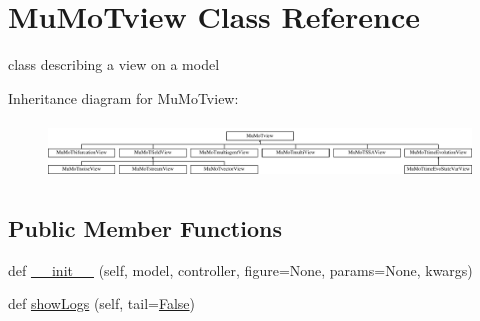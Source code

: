 \hypertarget{class_mu_mo_t_1_1_mu_mo_t_1_1_mu_mo_tview}{}\section{Mu\+Mo\+Tview Class Reference}
\label{class_mu_mo_t_1_1_mu_mo_t_1_1_mu_mo_tview}


class describing a view on a model  


Inheritance diagram for Mu\+Mo\+Tview\+:\begin{figure}[H]
\begin{center}
\leavevmode
\includegraphics[height=1.521739cm]{class_mu_mo_t_1_1_mu_mo_t_1_1_mu_mo_tview}
\end{center}
\end{figure}
\subsection*{Public Member Functions}
\begin{DoxyCompactItemize}
\item 
def \hyperlink{class_mu_mo_t_1_1_mu_mo_t_1_1_mu_mo_tview_a367325b3bd7ca4a7b7ec4107f9aa6a16}{\+\_\+\+\_\+init\+\_\+\+\_\+} (self, model, controller, figure=None, params=None, kwargs)
\item 
def \hyperlink{class_mu_mo_t_1_1_mu_mo_t_1_1_mu_mo_tview_a64ca78b9bf9f0f3150077ab79405a674}{show\+Logs} (self, tail=\hyperlink{namespace_mu_mo_t_1_1_mu_mo_t_a36cde68b055f3f2ee671020af4ccf4e2}{False})
\end{DoxyCompactItemize}
